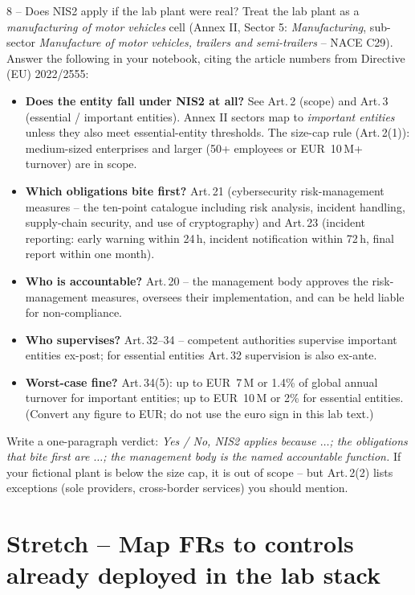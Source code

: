 \documentclass[11pt,a4paper]{article}
\begin{document}
\begin{stepbox}{8 -- Does NIS2 apply if the lab plant were real?}
Treat the lab plant as a \emph{manufacturing of motor vehicles} cell (Annex II, Sector 5: \emph{Manufacturing}, sub-sector \emph{Manufacture of motor vehicles, trailers and semi-trailers} -- NACE C29). Answer the following in your notebook, citing the article numbers from Directive (EU) 2022/2555:
\begin{itemize}\setlength{\itemsep}{1pt}
  \item \textbf{Does the entity fall under NIS2 at all?} See Art.\,2 (scope) and Art.\,3 (essential / important entities). Annex II sectors map to \emph{important entities} unless they also meet essential-entity thresholds. The size-cap rule (Art.\,2(1)): medium-sized enterprises and larger (50+ employees or EUR~10\,M+ turnover) are in scope.
  \item \textbf{Which obligations bite first?} Art.\,21 (cybersecurity risk-management measures -- the ten-point catalogue including risk analysis, incident handling, supply-chain security, and use of cryptography) and Art.\,23 (incident reporting: early warning within 24\,h, incident notification within 72\,h, final report within one month).
  \item \textbf{Who is accountable?} Art.\,20 -- the management body approves the risk-management measures, oversees their implementation, and can be held liable for non-compliance.
  \item \textbf{Who supervises?} Art.\,32--34 -- competent authorities supervise important entities ex-post; for essential entities Art.\,32 supervision is also ex-ante.
  \item \textbf{Worst-case fine?} Art.\,34(5): up to EUR~7\,M or 1.4\% of global annual turnover for important entities; up to EUR~10\,M or 2\% for essential entities. (Convert any figure to EUR; do not use the euro sign in this lab text.)
\end{itemize}

Write a one-paragraph verdict: \emph{Yes / No, NIS2 applies because $\ldots$; the obligations that bite first are $\ldots$; the management body is the named accountable function.} If your fictional plant is below the size cap, it is out of scope -- but Art.\,2(2) lists exceptions (sole providers, cross-border services) you should mention.
\end{stepbox}

\section*{Stretch -- Map FRs to controls already deployed in the lab stack}
\end{document}
